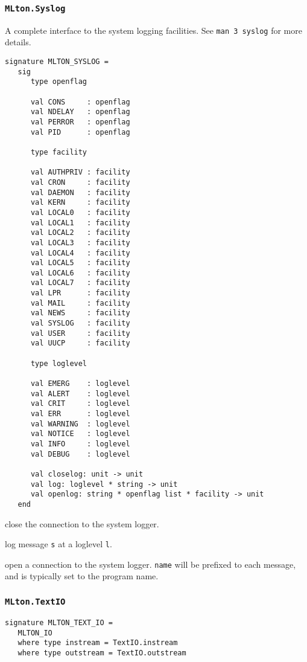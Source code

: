 \subsubsection{\tt MLton.Syslog}
A complete interface to the system logging facilities.  See {\tt man 3 syslog}
for more details.
\begin{verbatim}
signature MLTON_SYSLOG =
   sig
      type openflag
         
      val CONS     : openflag
      val NDELAY   : openflag
      val PERROR   : openflag
      val PID      : openflag

      type facility

      val AUTHPRIV : facility
      val CRON     : facility
      val DAEMON   : facility
      val KERN     : facility
      val LOCAL0   : facility
      val LOCAL1   : facility
      val LOCAL2   : facility
      val LOCAL3   : facility
      val LOCAL4   : facility
      val LOCAL5   : facility
      val LOCAL6   : facility
      val LOCAL7   : facility
      val LPR      : facility
      val MAIL     : facility
      val NEWS     : facility
      val SYSLOG   : facility
      val USER     : facility
      val UUCP     : facility

      type loglevel

      val EMERG    : loglevel
      val ALERT    : loglevel
      val CRIT     : loglevel
      val ERR      : loglevel
      val WARNING  : loglevel
      val NOTICE   : loglevel
      val INFO     : loglevel
      val DEBUG    : loglevel

      val closelog: unit -> unit
      val log: loglevel * string -> unit
      val openlog: string * openflag list * facility -> unit
   end
\end{verbatim}

\begin{description}
close the connection to the system logger.

log message {\tt s} at a loglevel {\tt l}.

open a connection to the system logger. {\tt name} will be prefixed to each
message, and is typically set to the program name.

\end{description}

\subsubsection{{\tt MLton.TextIO}}
\begin{verbatim}
signature MLTON_TEXT_IO =
   MLTON_IO
   where type instream = TextIO.instream
   where type outstream = TextIO.outstream
\end{verbatim}

